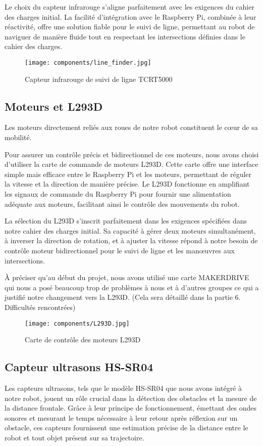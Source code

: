 Le choix du capteur infrarouge s'aligne parfaitement avec les exigences du cahier des charges initial. La facilité d'intégration avec le Raspberry Pi, combinée à leur réactivité, offre une solution fiable pour le suivi de ligne, permettant au robot de naviguer de manière fluide tout en respectant les intersections définies dans le cahier des charges.

\begin{figure}[h]
    \centering
    \texttt{[image: components/line\_finder.jpg]}
    \caption{Capteur infrarouge de suivi de ligne TCRT5000}
    \label{fig:TCRT5000}
\end{figure}

\subsection{Moteurs et L293D}
Les moteurs directement reliés aux roues de notre robot constituent le cœur de sa mobilité.

Pour assurer un contrôle précis et bidirectionnel de ces moteurs, nous avons choisi d'utiliser la carte de commande de moteurs L293D. Cette carte offre une interface simple mais efficace entre le Raspberry Pi et les moteurs, permettant de réguler la vitesse et la direction de manière précise. Le L293D fonctionne en amplifiant les signaux de commande du Raspberry Pi pour fournir une alimentation adéquate aux moteurs, facilitant ainsi le contrôle des mouvements du robot.

La sélection du L293D s'inscrit parfaitement dans les exigences spécifiées dans notre cahier des charges initial. Sa capacité à gérer deux moteurs simultanément, à inverser la direction de rotation, et à ajuster la vitesse répond à notre besoin de contrôle moteur bidirectionnel pour le suivi de ligne et les manœuvres aux intersections.

À préciser qu'au début du projet, nous avons utilisé une carte MAKERDRIVE qui nous a posé beaucoup trop de problèmes à nous et à d'autres groupes ce qui a justifié notre changement vers la L293D. (Cela sera détaillé dans la partie 6. Difficultés rencontrées)

\begin{figure}[h]
    \centering
    \texttt{[image: components/L293D.jpg]}
    \caption{Carte de contrôle des moteurs L293D}
    \label{fig:L293D}
\end{figure}

\subsection{Capteur ultrasons HS-SR04}
Les capteurs ultrasons, tels que le modèle HS-SR04 que nous avons intégré à notre robot, jouent un rôle crucial dans la détection des obstacles et la mesure de la distance frontale. Grâce à leur principe de fonctionnement, émettant des ondes sonores et mesurant le temps nécessaire à leur retour après réflexion sur un obstacle, ces capteurs fournissent une estimation précise de la distance entre le robot et tout objet présent sur sa trajectoire.

